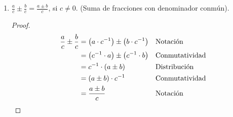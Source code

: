 \documentclass[11pt]{article}
\begin{document}
\begin{enumerate}[label=\alph*)]
\pagebreak

    \item $\frac{a}{c} \pm  \frac{b}{c}=\frac{a\pm b}{c}$, si $c\neq 0$. (Suma de fracciones con denominador conmún).
    \vspace{-1em}
    \begin{proof} 
    \begin{align*}
    \frac{a}{c} \pm  \frac{b}{c} &= \bigl(a\cdot c^{-1}\bigr) \pm  \bigl(b\cdot c^{-1}\bigr) && \text{Notación}\\
    &= \bigl(c^{-1} \cdot a\bigr) \pm  \bigl(c^{-1} \cdot b\bigr) && \text{Conmutatividad}\\
    &= c^{-1} \cdot (a\pm b) && \text{Distribución}\\
    &= (a\pm b) \cdot c^{-1} && \text{Conmutatividad}\\
    &= \frac{a\pm b}{c} && \text{Notación} \qedhere
    \end{align*}
    \end{proof} \vspace{-1em}


\end{enumerate}
\end{document}
